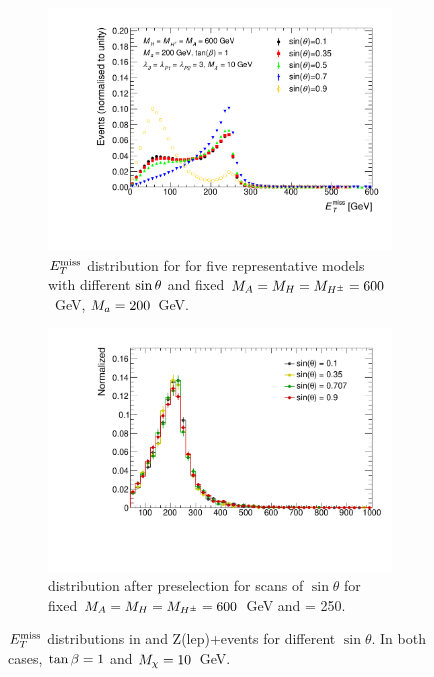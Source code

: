 \begin{figure}%
	\centering

	\begin{subfigure}[t]{0.75\textwidth}
	\centering
	\includegraphics[width=\textwidth]{texinputs/04_grid/figures/monoHbb_sinp_scan_MA600_Ma200_MET_liny_norm2one.pdf}
	\caption{$E_T^\mathrm{miss}$ distribution for for five representative models with different $\sin\theta$ and fixed $M_{A} = M_{H} = M_{H^{\pm}} = 600 $~GeV, $M_{a} = 200$~GeV.
	\label{fig:monoHbb_sinp_scan_mA600_ma200_met}} 
    \end{subfigure}
    \begin{subfigure}[t]{0.75\textwidth}
	\centering
	\includegraphics[width=\textwidth]{texinputs/04_grid/figures/monoz/leptonic/SinpScan_mA600_ma250_MET.pdf}	
	\caption{\MET distribution after preselection for scans of $\sin{\theta}$ for fixed $M_{A} = M_{H} = M_{H^{\pm}} = 600 $~GeV and \ma = 250.
	\label{fig:monoz_kin_sintheta}}
    \end{subfigure}
    
    \caption{$E_T^\mathrm{miss}$ distributions in \monohbb and Z(lep)+\MET events for different $\sin{\theta}$. In both cases, $\tan\beta = 1$ and $M_{\chi} = 10$~GeV. }
    
\end{figure}

